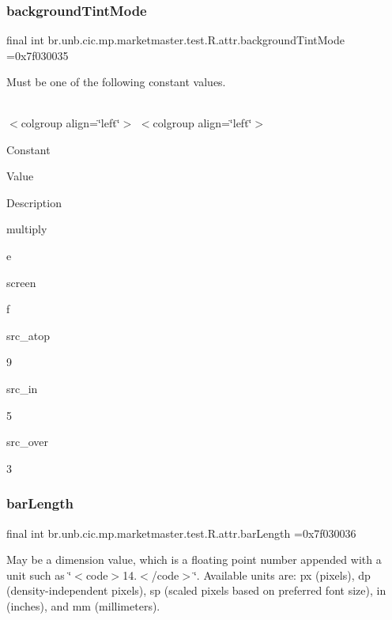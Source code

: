 \subsubsection{\texorpdfstring{background\+Tint\+Mode}{backgroundTintMode}}
{\footnotesize\ttfamily final int br.\+unb.\+cic.\+mp.\+marketmaster.\+test.\+R.\+attr.\+background\+Tint\+Mode =0x7f030035\hspace{0.3cm}{\ttfamily [static]}}

Must be one of the following constant values.

\tabulinesep=1mm
\begin{longtabu} spread 0pt [c]{*{0}{|X[-1]}|}
\hline
\end{longtabu}
$<$colgroup align=\char`\"{}left\char`\"{}$>$ $<$colgroup align=\char`\"{}left\char`\"{}$>$ 

Constant

Value

Description 

multiply

e

screen

f

src\+\_\+atop

9

src\+\_\+in

5

src\+\_\+over

3\mbox{\label{classbr_1_1unb_1_1cic_1_1mp_1_1marketmaster_1_1test_1_1R_1_1attr_a88abde88ded30262ad227af1a47be036}} 
\subsubsection{\texorpdfstring{bar\+Length}{barLength}}
{\footnotesize\ttfamily final int br.\+unb.\+cic.\+mp.\+marketmaster.\+test.\+R.\+attr.\+bar\+Length =0x7f030036\hspace{0.3cm}{\ttfamily [static]}}

May be a dimension value, which is a floating point number appended with a unit such as \char`\"{}$<$code$>$14.\+5sp$<$/code$>$\char`\"{}. Available units are\+: px (pixels), dp (density-\/independent pixels), sp (scaled pixels based on preferred font size), in (inches), and mm (millimeters). \mbox{\label{classbr_1_1unb_1_1cic_1_1mp_1_1marketmaster_1_1test_1_1R_1_1attr_a08d897aa8285d2caf296c6a78ae0c6ef}} 
